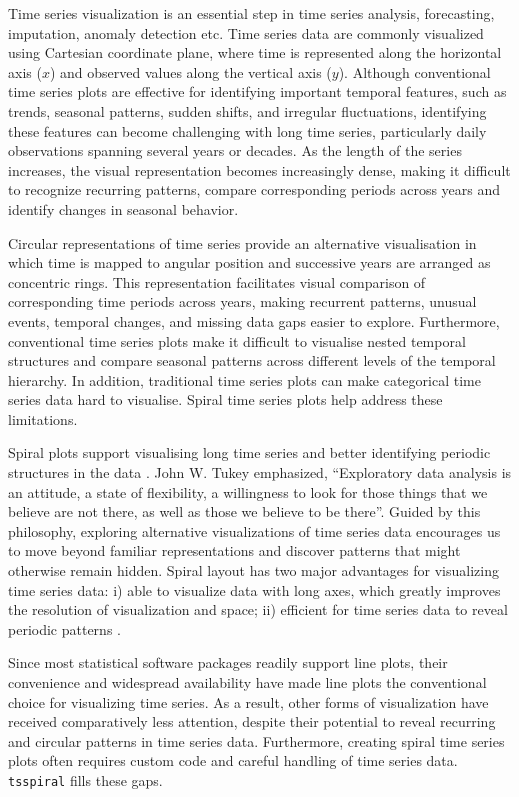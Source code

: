\documentclass[
  12pt,
  a4paper,
]{article}
\begin{document}
Time series visualization is an essential step in time series analysis,
forecasting, imputation, anomaly detection etc. Time series data are
commonly visualized using Cartesian coordinate plane, where time is
represented along the horizontal axis (\(x\)) and observed values along
the vertical axis (\(y\)). Although conventional time series plots are
effective for identifying important temporal features, such as trends,
seasonal patterns, sudden shifts, and irregular fluctuations,
identifying these features can become challenging with long time series,
particularly daily observations spanning several years or decades. As
the length of the series increases, the visual representation becomes
increasingly dense, making it difficult to recognize recurring patterns,
compare corresponding periods across years and identify changes in
seasonal behavior.

Circular representations of time series provide an alternative
visualisation in which time is mapped to angular position and successive
years are arranged as concentric rings. This representation facilitates
visual comparison of corresponding time periods across years, making
recurrent patterns, unusual events, temporal changes, and missing data
gaps easier to explore. Furthermore, conventional time series plots make
it difficult to visualise nested temporal structures and compare
seasonal patterns across different levels of the temporal hierarchy. In
addition, traditional time series plots can make categorical time series
data hard to visualise. Spiral time series plots help address these
limitations.

Spiral plots support visualising long time series and better identifying
periodic structures in the data
\autocite{weber2001visualizing,rakuschek2026guided}. John W. Tukey
emphasized, ``Exploratory data analysis is an attitude, a state of
flexibility, a willingness to look for those things that we believe are
not there, as well as those we believe to be
there''\autocite{tukey1977exploratory}. Guided by this philosophy,
exploring alternative visualizations of time series data encourages us
to move beyond familiar representations and discover patterns that might
otherwise remain hidden. Spiral layout has two major advantages for
visualizing time series data: i) able to visualize data with long axes,
which greatly improves the resolution of visualization and space; ii)
efficient for time series data to reveal periodic patterns
\autocite{spiralize}.

Since most statistical software packages readily support line plots,
their convenience and widespread availability have made line plots the
conventional choice for visualizing time series. As a result, other
forms of visualization have received comparatively less attention,
despite their potential to reveal recurring and circular patterns in
time series data. Furthermore, creating spiral time series plots often
requires custom code and careful handling of time series data.
\texttt{tsspiral} fills these gaps.
\end{document}
